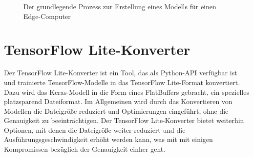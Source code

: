 \begin{figure}[!h]
  
    
    \caption{Der grundlegende Prozess zur Erstellung eines Modells 
        für einen Edge-Computer\cite{GoogleTensorFlowModel:2019}}\label{Software:Flowchart}
\end{figure}


\section{TensorFlow Lite-Konverter}

Der TensorFlow Lite-Konverter ist ein Tool, das als Python-API verfügbar ist und trainierte TensorFlow-Modelle in das TensorFlow Lite-Format konvertiert. Dazu wird das Keras-Modell in die Form eines FlatBuffers gebracht, ein spezielles platzsparend Dateiformat. Im Allgemeinen wird durch das Konvertieren von Modellen die Dateigröße reduziert und Optimierungen eingeführt, ohne die Genauigkeit zu beeinträchtigen. Der TensorFlow Lite-Konverter bietet weiterhin Optionen, mit denen die Dateigröße weiter reduziert und die Ausführungsgeschwindigkeit erhöht werden kann, was mit mit einigen Kompromissen bezüglich der Genauigkeit einher geht. \cite{Google.09.10.2020}\cite{Warden:2020}

